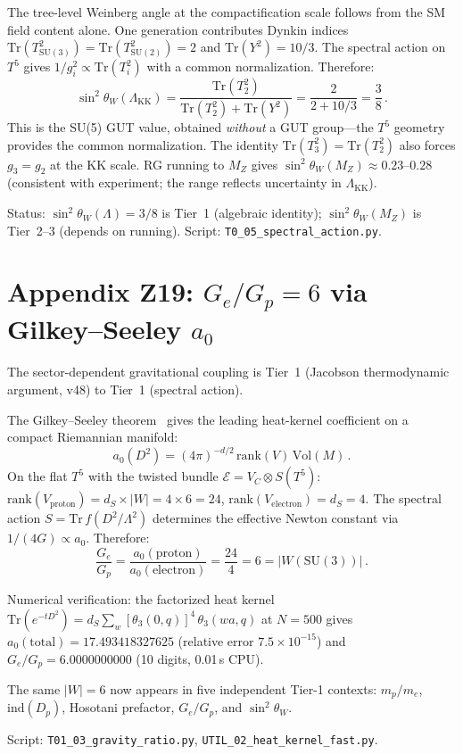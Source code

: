 \documentclass[11pt,a4paper]{article}
\begin{document}
The tree-level Weinberg angle at the compactification scale follows
from the SM field content alone. One generation contributes Dynkin indices
$\mathrm{Tr}(T_{\mathrm{SU}(3)}^2)=\mathrm{Tr}(T_{\mathrm{SU}(2)}^2)=2$
and $\mathrm{Tr}(Y^2)=10/3$.
The spectral action on~$T^5$ gives $1/g_i^2\propto\mathrm{Tr}(T_i^2)$
with a common normalization. Therefore:
\begin{equation}
  \sin^2\theta_W(\Lambda_{\mathrm{KK}})
  = \frac{\mathrm{Tr}(T_2^2)}{\mathrm{Tr}(T_2^2)+\mathrm{Tr}(Y^2)}
  = \frac{2}{2+10/3} = \frac{3}{8}\,.
\end{equation}
This is the SU(5) GUT value, obtained \emph{without} a GUT group---the
$T^5$ geometry provides the common normalization. The identity
$\mathrm{Tr}(T_3^2)=\mathrm{Tr}(T_2^2)$ also forces $g_3=g_2$ at the KK
scale.  RG running to $M_Z$ gives $\sin^2\theta_W(M_Z)\approx 0.23$--$0.28$
(consistent with experiment; the range reflects uncertainty in $\Lambda_{\mathrm{KK}}$).

Status: $\sin^2\theta_W(\Lambda)=3/8$ is Tier~1 (algebraic identity);
$\sin^2\theta_W(M_Z)$ is Tier~2--3 (depends on running).
Script: \texttt{T0\_05\_spectral\_action.py}.

\section{Appendix Z19: $G_e/G_p=6$ via Gilkey--Seeley $a_0$}
\label{app:gravity_spectral}

The sector-dependent gravitational coupling is Tier~1
(Jacobson thermodynamic argument, v48) to Tier~1 (spectral action).

The Gilkey--Seeley theorem~\cite{Gilkey1984,Seeley1967} gives the
leading heat-kernel coefficient on a compact Riemannian manifold:
\begin{equation}
  a_0(D^2) = (4\pi)^{-d/2}\,\mathrm{rank}(V)\,\mathrm{Vol}(M)\,.
\end{equation}
On the flat $T^5$ with the twisted bundle $\mathcal{E}=V_C\otimes S(T^5)$:
$\mathrm{rank}(V_{\mathrm{proton}})=d_S\times|W|=4\times 6=24$,
$\mathrm{rank}(V_{\mathrm{electron}})=d_S=4$.
The spectral action $S=\mathrm{Tr}\,f(D^2/\Lambda^2)$ determines the
effective Newton constant via $1/(4G)\propto a_0$. Therefore:
\begin{equation}
  \frac{G_e}{G_p} = \frac{a_0(\text{proton})}{a_0(\text{electron})}
  = \frac{24}{4} = 6 = |W(\mathrm{SU}(3))|\,.
\end{equation}

Numerical verification: the factorized heat kernel
$\mathrm{Tr}(e^{-tD^2})=d_S\sum_w[\theta_3(0,q)]^4\,\theta_3(wa,q)$
at $N\!=\!500$ gives $a_0(\mathrm{total})=17.493418327625$
(relative error $7.5\times 10^{-15}$) and
$G_e/G_p = 6.0000000000$ (10 digits, 0.01\,s CPU).

The same $|W|=6$ now appears in five independent Tier-1 contexts:
$m_p/m_e$, $\mathrm{ind}(D_p)$, Hosotani prefactor, $G_e/G_p$, and
$\sin^2\theta_W$.

Script: \texttt{T01\_03\_gravity\_ratio.py},
\texttt{UTIL\_02\_heat\_kernel\_fast.py}.
\end{document}

